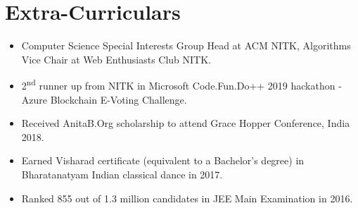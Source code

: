 \documentclass{article}
\begin{document}
\section{Extra-Curriculars}
\begin{itemize}
\item Computer Science Special Interests Group Head at ACM NITK, Algorithms Vice Chair at Web Enthusiasts Club NITK.
\item 2\textsuperscript{nd} runner up from NITK in Microsoft Code.Fun.Do++ 2019 hackathon - Azure Blockchain E-Voting Challenge.
\item Received AnitaB.Org scholarship to attend Grace Hopper Conference, India 2018.
\item Earned Visharad certificate (equivalent to a Bachelor's degree) in Bharatanatyam Indian classical dance in 2017.
\item Ranked 855 out of 1.3 million candidates in JEE Main Examination in 2016.
\end{itemize}
\end{document}
